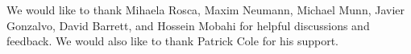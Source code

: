 \documentclass{article}
\begin{document}
\newpage

\begin{ack}
We would like to thank Mihaela Rosca, Maxim Neumann, Michael Munn, Javier Gonzalvo, David Barrett, and Hossein Mobahi for helpful discussions and feedback. We would also like to thank Patrick Cole for his support.
\end{ack}



\medskip
\end{document}
